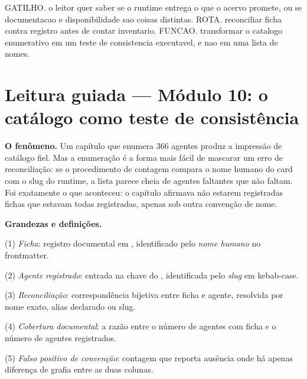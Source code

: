 \begin{processo}
GATILHO. o leitor quer saber se o runtime entrega o que o acervo promete, ou se documentacao e disponibilidade sao coisas distintas.
ROTA. reconciliar ficha contra registro antes de contar inventario.
FUNCAO. transformar o catalogo enumerativo em um teste de consistencia executavel, e nao em uma lista de nomes.
\end{processo}

\section[Leitura guiada]{Leitura guiada — Módulo 10: o catálogo como teste de consistência}

\begin{descricao}
\textbf{O fenômeno.} Um capítulo que enumera 366 agentes produz a impressão de catálogo fiel. Mas a enumeração é a forma mais fácil de mascarar um erro de reconciliação: se o procedimento de contagem compara o nome humano do card com o slug do runtime, a lista parece cheia de agentes faltantes que não faltam. Foi exatamente o que aconteceu: o capítulo afirmava não estarem registradas fichas que estavam todas registradas, apenas sob outra convenção de nome.
\end{descricao}

\begin{definicao}
\textbf{Grandezas e definições.}\par
(1) \emph{Ficha}: registro documental em , identificado pelo \emph{nome humano} no frontmatter.\par
(2) \emph{Agente registrado}: entrada na chave  do , identificada pelo \emph{slug} em kebab-case.\par
(3) \emph{Reconciliação}: correspondência bijetiva entre ficha e agente, resolvida por nome exato, alias declarado ou slug.\par
(4) \emph{Cobertura documental}: a razão entre o número de agentes com ficha e o número de agentes registrados.\par
(5) \emph{Falso positivo de convenção}: contagem que reporta ausência onde há apenas diferença de grafia entre as duas colunas.
\end{definicao}

